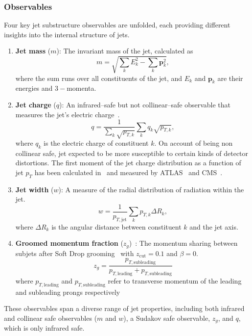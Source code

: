             \subsubsection{Observables}
                Four key jet substructure observables are unfolded, each providing different insights into the internal structure of jets.
                \begin{enumerate}
                \item \textbf{Jet mass} ($m$): The invariant mass of the jet, calculated as
                \[
                    m = \sqrt{\sum_k E_k^2 - \sum_k \mathbf{p}_k^2},
                \]
                where the sum runs over all constituents of the jet, and $E_k$ and $\mathbf{p}_k$ are their energies and \(3-\)momenta.
            \item \textbf{Jet charge} ($q$): An infrared--safe but not collinear--safe observable that measures the jet's electric charge~\cite{Kang:2023ptt, ATLAS:2015rlw}.
            \[
                q = \frac{1}{\sum_k \sqrt{p_{T,k}}}\sum_k q_k \sqrt{p_{T,k}},
            \]
            where $q_k$ is the electric charge of constituent $k$.
            On account of being non collinear safe, jet expected to be more susceptible to certain kinds of detector distortions.
            The first moment of the jet charge distribution as a function of jet $p_T$ has been calculated in~\cite{Krohn2013JetLHC,Waalewijn2012CalculatingJet,Li:2019dre,Li2020JetMatter,Kang2020JetCollider} and measured by ATLAS~\cite{ATLAS:2015rlw} and CMS~\cite{CMS:2017yer,CMS:2020plq}.
            \item \textbf{Jet width} ($w$): A measure of the radial distribution of radiation within the jet.
            \[
                w = \frac{1}{p_{T,\text{jet}}}\sum_k p_{T,k} \Delta R_k,
            \]
            where $\Delta R_k$ is the angular distance between constituent $k$ and the jet axis.
            \item \textbf{Groomed momentum fraction} ($z_g$)~\cite{Larkoski:2015lea}: The momentum sharing between subjets after Soft Drop grooming~\cite{Dasgupta2013TowardsSubstructure, Larkoski2014SoftDrop} with $z_{\text{cut}} = 0.1$ and $\beta = 0$.
            \[
                z_g = \frac{p_{T,\text{subleading}}}{p_{T,\text{leading}} + p_{T,\text{subleading}}}
            \]
            where \(p_{T,\text{leading}}\) and \(p_{T,\text{subleading}}\) refer to transverse momentum of the leading and subleading prongs respectively~\cite{ALargeIonColliderExperiment:2021mqf}
            \end{enumerate}
            These observables span a diverse range of jet properties, including both infrared and collinear safe observables ($m$ and $w$), a Sudakov safe observable, \(z_g\), and \(q\), which is only infrared safe.

